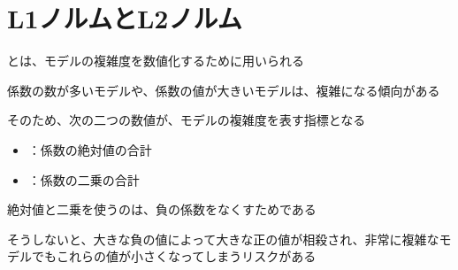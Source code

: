 \documentclass[../../../topic_machine-learning]{subfiles}
\begin{document}
\sectionline
\section{L1ノルムとL2ノルム}

とは、モデルの複雑度を数値化するために用いられる

\br

係数の数が多いモデルや、係数の値が大きいモデルは、複雑になる傾向がある

そのため、次の二つの数値が、モデルの複雑度を表す指標となる

\begin{itemize}
  \item {}：係数の絶対値の合計
  \item {}：係数の二乗の合計
\end{itemize}

絶対値と二乗を使うのは、負の係数をなくすためである

そうしないと、大きな負の値によって大きな正の値が相殺され、非常に複雑なモデルでもこれらの値が小さくなってしまうリスクがある
\end{document}
